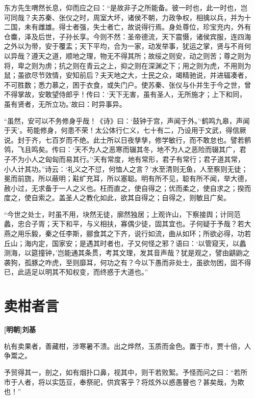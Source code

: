 \documentclass[UTF8,titlepage,oneside]{ctexbook}
\begin{document}
东方先生喟然长息，仰而应之曰：“是故非子之所能备。彼一时也，此一时也，岂可同哉？夫苏秦、张仪之时，周室大坏，诸侯不朝，力政争权，相擒以兵，并为十二国，未有雌雄。得士者强，失士者亡，故说得行焉。身处尊位，珍宝充内，外有仓麋，泽及后世，子孙长享。今则不然：圣帝德流，天下震慑，诸侯宾服，连四海之外以为带，安于覆盂；天下平均，合为一家，动发举事，犹运之掌，贤与不肖何以异哉？遵天之道，顺地之理，物无不得其所；故绥之则安，动之则苦；尊之则为将，卑之则为虏；抗之则在青云之上，抑之则在深渊之下；用之则为虎，不用则为鼠；虽欲尽节效情，安知前后？夫天地之大，士民之众，竭精驰说，并进辐凑者，不可胜数；悉力慕之，困于衣食，或失门户。使苏秦、张仪与仆并生于今之世，曾不得掌故，安敢望侍郎乎！传曰：‘天下无害，虽有圣人，无所施才；上下和同，虽有贤者，无所立功。’故曰：时异事异。


“虽然，安可以不务修身乎哉！《诗》曰：‘鼓钟于宫，声闻于外。’‘鹤鸣九皋，声闻于天’。苟能修身，何患不荣！太公体行仁义，七十有二，乃设用于文武，得信厥说。封于齐，七百岁而不绝。此士所以日夜孳孳，修学敏行，而不敢怠也。譬若鹡鸰，飞且鸣矣。传曰：‘天不为人之恶寒而辍其冬，地不为人之恶险而辍其广，君子不为小人之匈匈而易其行。’‘天有常度，地有常形，君子有常行；君子道其常，小人计其功。”诗云：‘礼义之不愆，何恤人之言？’水至清则无鱼，人至察则无徒；冕而前旒，所以蔽明；黈纩充耳，所以塞聪。明有所不见，聪有所不闻，举大德，赦小过，无求备于一人之义也。枉而直之，使自得之；优而柔之，使自求之；揆而度之，使自索之。盖圣人之教化如此，欲其自得之；自得之，则敏且广矣。


“今世之处士，时虽不用，块然无徒，廓然独居；上观许山，下察接舆；计同范蠡，忠合子胥；天下和平，与义相扶，寡偶少徒，固其宜也。子何疑于予哉？若大燕之用乐毅，秦之任李斯，郦食其之下齐，说行如流，曲从如环；所欲必得，功若丘山；海内定，国家安；是遇其时者也，子又何怪之邪？语曰：‘以管窥天，以蠡测海，以筵撞钟，’岂能通其条贯，考其文理，发其音声哉？犹是观之，譬由鼱鼩之袭狗，孤豚之咋虎，至则靡耳，何功之有？今以下愚而非处士，虽欲勿困，固不得已，此适足以明其不知权变，而终惑于大道也。”



\chapter*{卖柑者言}
\begin{center}
	\textbf{[明朝]刘基}
\end{center}


杭有卖果者，善藏柑，涉寒暑不溃。出之烨然，玉质而金色。置于市，贾十倍，人争鬻之。


予贸得其一，剖之，如有烟扑口鼻，视其中，则干若败絮。予怪而问之曰：“若所市于人者，将以实笾豆，奉祭祀，供宾客乎？将炫外以惑愚瞽也？甚矣哉，为欺也！”
\end{document}

